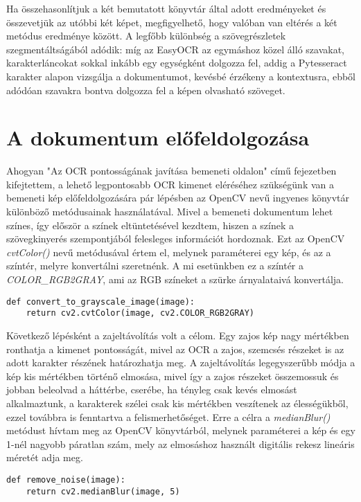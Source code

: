 \documentclass[12pt]{report}
\begin{document}
\noindent
Ha összehasonlítjuk a két bemutatott könyvtár által adott eredményeket és összevetjük az utóbbi két képet, megfigyelhető, hogy valóban van eltérés a két metódus eredménye között. A legfőbb különbség a szövegrészletek szegmentáltságából adódik: míg az EasyOCR az egymáshoz közel álló szavakat, karakterláncokat sokkal inkább egy egységként dolgozza fel, addig a Pytesseract karakter alapon vizsgálja a dokumentumot, kevésbé érzékeny a kontextusra, ebből adódóan szavakra bontva dolgozza fel a képen olvasható szöveget.

\section{A dokumentum előfeldolgozása}

Ahogyan "Az OCR pontosságának javítása bemeneti oldalon" című fejezetben kifejtettem, a lehető legpontosabb OCR kimenet eléréséhez szükségünk van a bemeneti kép előfeldolgozására pár lépésben az OpenCV nevű ingyenes könyvtár különböző metódusainak használatával. \cite{opencv_functions}
Mivel a bemeneti dokumentum lehet színes, így először a színek eltüntetésével kezdtem, hiszen a színek a szövegkinyerés szempontjából felesleges információt hordoznak. Ezt az OpenCV \emph{cvtColor()} nevű metódusával értem el, melynek paraméterei egy kép, és az a színtér, melyre konvertálni szeretnénk. A mi esetünkben ez a színtér a \emph{COLOR\_RGB2GRAY}, ami az RGB színeket a szürke árnyalataivá konvertálja.

\begin{verbatim}
def convert_to_grayscale_image(image):
    return cv2.cvtColor(image, cv2.COLOR_RGB2GRAY)
\end{verbatim}

\noindent
Következő lépésként a zajeltávolítás volt a célom. Egy zajos kép nagy mértékben ronthatja a kimenet pontosságát, mivel az OCR a zajos, szemcsés részeket is az adott karakter részének határozhatja meg. A zajeltávolítás legegyszerűbb módja a kép kis mértékben történő elmosása, mivel így a zajos részeket összemossuk és jobban beleolvad a háttérbe, cserébe, ha tényleg csak kevés elmosást alkalmaztunk, a karakterek szélei csak kis mértékben veszítenek az élességükből, ezzel továbbra is fenntartva a felismerhetőséget.
Erre a célra a \emph{medianBlur()} metódust hívtam meg az OpenCV könyvtárból, melynek paraméterei a kép és egy 1-nél nagyobb páratlan szám, mely az elmosáshoz használt digitális rekesz lineáris méretét adja meg.

\begin{verbatim}
def remove_noise(image):
    return cv2.medianBlur(image, 5)
\end{verbatim}
\end{document}
